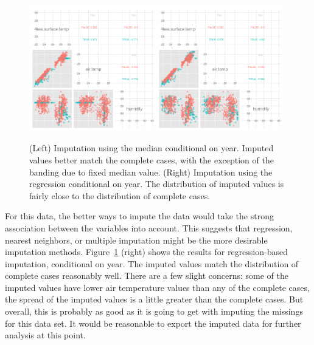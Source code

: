 \documentclass[article]{jss}
\begin{document}
\begin{figure}[htp]
\centerline{\includegraphics[width=0.49\textwidth]{tao3_pairwise.png}\includegraphics[width=0.49\textwidth]{tao5_pairwise.png}}
\caption{(Left) Imputation using the median conditional on year. Imputed values better match the complete cases, with the exception of the banding due to fixed median value. (Right) Imputation using the regression conditional on year. The distribution of imputed values is fairly close to the distribution of complete cases.}
\label{tao3}
\end{figure}

For this data, the better ways to impute the data would take the strong association between the variables into account. This suggests that regression, nearest neighbors, or multiple imputation might be the more desirable imputation methods. Figure~\ref{tao3} (right) shows the results for regression-based imputation, conditional on year. The imputed values match the distribution of complete cases reasonably well. There are a few slight concerns: some of the imputed values have lower air temperature values than any of the complete cases, the spread of the imputed values is a little greater than the complete cases. But overall, this is probably as good as it is going to get with imputing the missings for this data set. It would be reasonable to export the imputed data for further analysis at this point.
\end{document}
